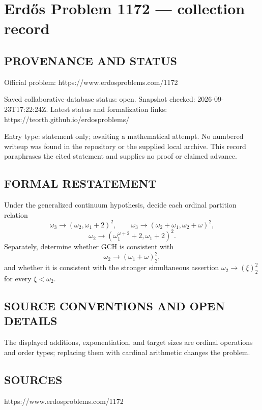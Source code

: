 \section*{Erd\H{o}s Problem 1172 --- collection record}

\subsection*{PROVENANCE AND STATUS}
Official problem: https://www.erdosproblems.com/1172

Saved collaborative-database status: open.
Snapshot checked: 2026-09-23T17:22:24Z.
Latest status and formalization links: https://teorth.github.io/erdosproblems/

Entry type: statement only; awaiting a mathematical attempt. No numbered writeup was found in the repository or the supplied local archive. This record paraphrases the cited statement and supplies no proof or claimed advance.

\subsection*{FORMAL RESTATEMENT}
Under the generalized continuum hypothesis, decide each ordinal partition relation
\[
\omega_3\longrightarrow(\omega_2,\omega_1+2)^2,
\qquad
\omega_3\longrightarrow(\omega_2+\omega_1,\omega_2+\omega)^2,
\]
\[
\omega_2\longrightarrow(\omega_1^{\omega+2}+2,\omega_1+2)^2.
\]
Separately, determine whether GCH is consistent with
\[
\omega_2\longrightarrow(\omega_1+\omega)^2_2,
\]
and whether it is consistent with the stronger simultaneous assertion $\omega_2\longrightarrow(\xi)^2_2$ for every $\xi<\omega_2$.

\subsection*{SOURCE CONVENTIONS AND OPEN DETAILS}
The displayed additions, exponentiation, and target sizes are ordinal operations and order types; replacing them with cardinal arithmetic changes the problem.

\subsection*{SOURCES}
https://www.erdosproblems.com/1172

